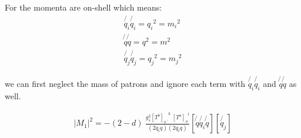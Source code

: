 For the momenta are on-shell which means:
\begin{equation}
\begin{split}
\not{q_i}\not{q_i} = {q_i}^2= {m_i}^2\\
\not{q}\not{q} = {q}^2= {m}^2\\
\not{q_j}\not{q_j} = {q_j}^2= {m_j}^2
\end{split}
\end{equation}

we can first neglect the mass of patrons and ignore each term with $ \not{q_i}\not{q_i} $ and  $ \not{q}\not{q} $ as well.

\begin{equation}
\begin{split}
|M_1|^2=-(2-d)\:\frac{g_s^2  {[T^b]_{o\:^{\prime}}}^k \: {[T^a]_o}^l }{(2q_i q)(2q_i q)}
[\not{q} \not{q_i} \not{q}]
[\not{q_j}]
\end{split}
\end{equation}


